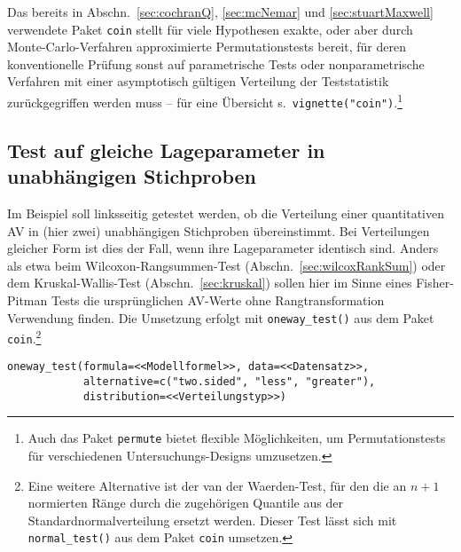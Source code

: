 Das bereits in Abschn.\ \ref{sec:cochranQ}, \ref{sec:mcNemar} und \ref{sec:stuartMaxwell} verwendete Paket \lstinline!coin! stellt für viele Hypothesen exakte, oder aber durch Monte-Carlo-Verfahren approximierte Permutationstests bereit, für deren konventionelle Prüfung sonst auf parametrische Tests oder nonparametrische Verfahren mit einer asymptotisch gültigen Verteilung der Teststatistik zurückgegriffen werden muss -- für eine Übersicht s.\ \lstinline!vignette("coin")!.\footnote{Auch das Paket \lstinline!permute! \cite{Simpson2011} bietet flexible Möglichkeiten, um Permutationstests für verschiedenen Untersuchungs-Designs umzusetzen.}

\subsection{Test auf gleiche Lageparameter in unabhängigen Stichproben}
\label{sec:permKInd}

Im Beispiel soll linksseitig getestet werden, ob die Verteilung einer quantitativen AV in (hier zwei) unabhängigen Stichproben übereinstimmt. Bei Verteilungen gleicher Form ist dies der Fall, wenn ihre Lageparameter identisch sind. Anders als etwa beim Wilcoxon-Rangsummen-Test (Abschn.\ \ref{sec:wilcoxRankSum}) oder dem Kruskal-Wallis-Test (Abschn.\ \ref{sec:kruskal}) sollen hier im Sinne eines Fisher-Pitman Tests die ursprünglichen AV-Werte ohne Rangtransformation Verwendung finden. Die Umsetzung erfolgt mit \lstinline!oneway_test()! aus dem Paket \lstinline!coin!.\footnote{\label{ftn:vdWaerden} Eine weitere Alternative ist der van der Waerden-Test, für den die an $n+1$ normierten Ränge durch die zugehörigen Quantile aus der Standardnormalverteilung ersetzt werden. Dieser Test lässt sich mit  \lstinline!normal_test()! aus dem Paket  \lstinline!coin! umsetzen.}
\begin{lstlisting}
oneway_test(formula=<<Modellformel>>, data=<<Datensatz>>,
            alternative=c("two.sided", "less", "greater"),
            distribution=<<Verteilungstyp>>)
\end{lstlisting}

